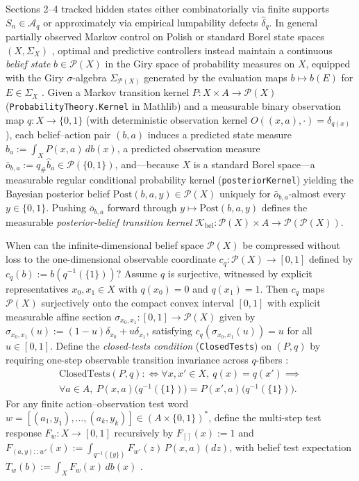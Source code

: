 \documentclass[11pt,a4paper]{article}
\begin{document}
Sections 2--4 tracked hidden states either combinatorially via finite
supports \(S_n \in \mathcal{A}_q\) or approximately via empirical
lumpability defects \(\widehat{\delta}_q\). In general partially
observed Markov control on Polish or standard Borel state spaces
\((X, \Sigma_X)\)
\citep{bertsekasShreve1978, hernandezLerma1996, kallenberg2021}, optimal
and predictive controllers instead maintain a continuous \emph{belief
state} \(b \in \mathcal{P}(X)\) in the Giry space of probability
measures on \(X\), equipped with the Giry \(\sigma\)-algebra
\(\Sigma_{\mathcal{P}(X)}\) generated by the evaluation maps
\(b \mapsto b(E)\) for \(E \in \Sigma_X\) \citep{astrom1965, giry1982}.
Given a Markov transition kernel \(P: X \times A \to \mathcal{P}(X)\)
(\texttt{ProbabilityTheory.Kernel} in Mathlib) and a measurable binary
observation map \(q: X \to \{0,1\}\) (with deterministic observation
kernel \(O((x,a), \cdot) = \delta_{q(x)}\)), each belief--action pair
\((b,a)\) induces a predicted state measure
\(\widehat{b}_a := \int_X P(x,a)\, db(x)\), a predicted observation
measure
\(\bar{o}_{b,a} := q_\# \widehat{b}_a \in \mathcal{P}(\{0,1\})\),
and---because \(X\) is a standard Borel space---a measurable regular
conditional probability kernel (\texttt{posteriorKernel}) yielding the
Bayesian posterior belief \(\mathrm{Post}(b,a,y) \in \mathcal{P}(X)\)
uniquely for \(\bar{o}_{b,a}\)-almost every \(y \in \{0,1\}\). Pushing
\(\bar{o}_{b,a}\) forward through \(y \mapsto \mathrm{Post}(b,a,y)\)
defines the measurable \emph{posterior-belief transition kernel}
\(\mathcal{K}_{\mathrm{bel}}: \mathcal{P}(X) \times A \to \mathcal{P}(\mathcal{P}(X))\).

When can the infinite-dimensional belief space \(\mathcal{P}(X)\) be
compressed without loss to the one-dimensional observable coordinate
\(c_q: \mathcal{P}(X) \to [0,1]\) defined by
\(c_q(b) := b(q^{-1}(\{1\}))\)? Assume \(q\) is surjective, witnessed by
explicit representatives \(x_0, x_1 \in X\) with \(q(x_0) = 0\) and
\(q(x_1) = 1\). Then \(c_q\) maps \(\mathcal{P}(X)\) surjectively onto
the compact convex interval \([0,1]\) with explicit measurable affine
section \(\sigma_{x_0, x_1}: [0,1] \to \mathcal{P}(X)\) given by
\(\sigma_{x_0, x_1}(u) := (1 - u)\delta_{x_0} + u \delta_{x_1}\),
satisfying \(c_q(\sigma_{x_0, x_1}(u)) = u\) for all \(u \in [0,1]\).
Define the \emph{closed-tests condition} (\texttt{ClosedTests}) on
\((P, q)\) by requiring one-step observable transition invariance across
\(q\)-fibers
\citep{burkeRosenblatt1958, kemenySnell1960, larsenSkou1991, givanDeanGreig2003}:
\[\begin{aligned}
\mathrm{ClosedTests}(P, q) :\iff \forall x, x' \in X,\ q(x) = q(x') \implies \\
\forall a \in A,\ P(x,a)\bigl(q^{-1}(\{1\})\bigr) = P(x',a)\bigl(q^{-1}(\{1\})\bigr).
\end{aligned}\] For any finite action--observation test word
\(w = [(a_1, y_1), \dots, (a_k, y_k)] \in (A \times \{0,1\})^*\), define
the multi-step test response \(F_w: X \to [0,1]\) recursively by
\(F_{[]}(x) := 1\) and
\(F_{(a,y)::w'}(x) := \int_{q^{-1}(\{y\})} F_{w'}(z)\, P(x,a)(dz)\),
with belief test expectation \(T_w(b) := \int_X F_w(x)\, db(x)\)
\citep{jaeger2000, littmanSuttonSingh2001}.
\end{document}
